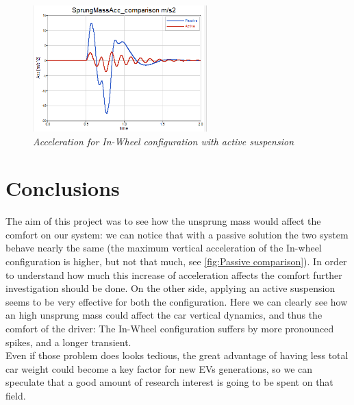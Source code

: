 \documentclass{article}
\numberwithin{equation}{section}
\numberwithin{figure}{section}
\numberwithin{table}{section}
\numberwithin{table}{section}
\begin{document}
\begin{figure}[H]
    \centering
    \includegraphics[width=0.6\textwidth]{Pictures/Active (In wheel configuration P30000 D1000).png}
    \caption{\emph{Acceleration for In-Wheel configuration with active suspension}}
    \label{fig:InWheel PID}
\end{figure}
\section{Conclusions}
The aim of this project was to see how the unsprung mass would affect the comfort on our system: we can notice that with a passive solution the two system behave nearly the same (the maximum vertical acceleration of the In-wheel configuration is higher, but not that much, see \cref{fig:Passive comparison}). In order to understand how much this increase of acceleration affects the comfort further investigation should be done.
On the other side, applying an active suspension seems to be very effective for both the configuration. Here we can clearly see how an high unsprung mass could affect the car vertical dynamics, and thus the comfort of the driver: The In-Wheel configuration suffers by more pronounced spikes, and a longer transient.\\
Even if those problem does looks tedious, the great advantage of having less total car weight could become a key factor for new EVs generations, so we can speculate that a good amount of research interest is going to be spent on that field.
\newpage



\end{document}
